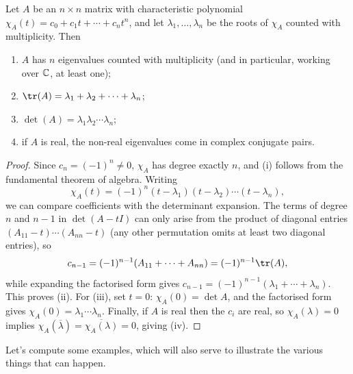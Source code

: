 \documentclass[a4paper]{scrartcl}
\begin{document}
\begin{proposition}
	Let $A$ be an $n \times n$ matrix with characteristic polynomial $\chi_A(t) = c_0 + c_1 t + \cdots + c_nt^n$, and let $\lambda_1, \dots, \lambda_n$ be the roots of $\chi_A$ counted with multiplicity. Then
	\begin{enumerate}[label=(\roman*)]
		\item $A$ has $n$ eigenvalues counted with multiplicity (and in particular, working over $\mathbb{C}$, at least one);
		\item $\tr (A) = \lambda_1 + \lambda_2 + \cdots + \lambda_n$;
		\item $\det(A) = \lambda_1 \lambda_2 \cdots \lambda_n$;
		\item if $A$ is real, the non-real eigenvalues come in complex conjugate pairs.
	\end{enumerate}
\end{proposition}
\begin{proof}
	Since $c_n = (-1)^n \neq 0$, $\chi_A$ has degree exactly $n$, and (i) follows from the fundamental theorem of algebra. Writing
	$$
	\chi_A(t) = (-1)^n (t - \lambda_1)(t - \lambda_2)\cdots(t - \lambda_n),
	$$
	we can compare coefficients with the determinant expansion. The terms of degree $n$ and $n - 1$ in $\det(A - tI)$ can only arise from the product of diagonal entries $(A_{11} - t) \cdots (A_{nn} - t)$ (any other permutation omits at least two diagonal entries), so
	$$
	c_{n - 1} = (-1)^{n-1}(A_{11} + \cdots + A_{nn}) = (-1)^{n-1}\tr(A),
	$$
	while expanding the factorised form gives $c_{n-1} = (-1)^{n-1}(\lambda_1 + \cdots + \lambda_n)$. This proves (ii). For (iii), set $t = 0$: $\chi_A(0) = \det A$, and the factorised form gives $\chi_A(0) = \lambda_1 \cdots \lambda_n$. Finally, if $A$ is real then the $c_i$ are real, so $\chi_A(\lambda) = 0$ implies $\chi_A(\overline{\lambda}) = \overline{\chi_A(\lambda)} = 0$, giving (iv).
\end{proof}

Let's compute some examples, which will also serve to illustrate the various things that can happen.
\end{document}

